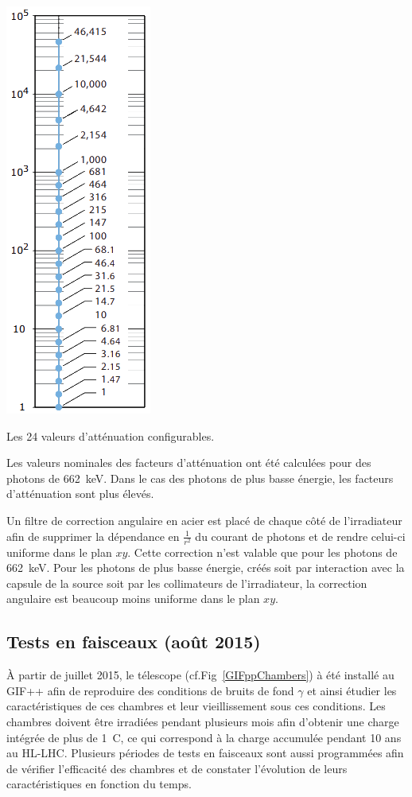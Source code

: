 \marginpar
{
	\centering
	\includegraphics[width=1.0\marginparwidth]{GLA/ValueAttenuateur.png}
	\captionsetup{type=figure}\caption{Les \num{24} valeurs d'atténuation configurables.}
	\label{ValueAttenuateur}
}

Les valeurs nominales des facteurs d'atténuation ont été calculées pour des photons de \SI{662}{\kilo\eV}. Dans le cas des photons de plus basse énergie, les facteurs d'atténuation sont plus élevés. 

Un filtre de correction angulaire en acier est placé de chaque côté de l'irradiateur afin de supprimer la dépendance en $\frac{1}{r^2}$ du courant de photons et de rendre celui-ci uniforme dans le plan $xy$. Cette correction n'est valable que pour les photons de \SI{662}{\kilo\eV}. Pour les photons de plus basse énergie, créés soit par interaction avec la capsule de la source soit par les collimateurs de l'irradiateur, la correction angulaire est beaucoup moins uniforme dans le plan $xy$.

\subsection{Tests en faisceaux (août 2015)}
\label{GIFFF}
À partir de juillet \num{2015}, le télescope (cf.Fig~\ref{GIFppChambers}) à été installé au GIF++ afin de reproduire des conditions de bruits de fond $\gamma$ et ainsi étudier les caractéristiques de ces chambres et leur vieillissement sous ces conditions. Les chambres doivent être irradiées pendant plusieurs mois afin d'obtenir une charge intégrée de plus de \SI{1}{\coulomb}, ce qui correspond à la charge accumulée pendant \num{10} ans au HL-LHC.
Plusieurs périodes de tests en faisceaux sont aussi programmées afin de vérifier l'efficacité des chambres et de constater l'évolution de leurs caractéristiques en fonction du temps. %

